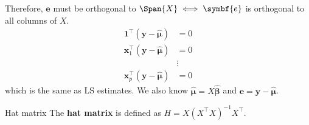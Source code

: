 Therefore, $ \symbf{e} $ must be orthogonal to $ \Span{X}
    \iff \symbf{e} $ is orthogonal to all columns of $ X $.
\begin{align*}
    \symbf{1}^\top(\symbf{y}-\hat{\symbf{\mu}})   & =       0 \\
    \symbf{x}_1^\top(\symbf{y}-\hat{\symbf{\mu}}) & =       0 \\
                                                  & \vdots    \\
    \symbf{x}_p^\top(\symbf{y}-\hat{\symbf{\mu}}) & =       0
\end{align*}
which is the same as LS estimates. We also know
$ \hat{\symbf{\mu}}=X\hat{\symbf{\beta}} $ and
$ \symbf{e}=\symbf{y}-\hat{\symbf{\mu}} $.
\begin{Definition}{Hat matrix}{}
    The \textbf{hat matrix} is defined as
    $ H=X(X^\top X)^{-1}X^{\top} $.
\end{Definition}


